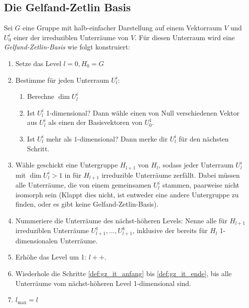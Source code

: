  \subsection{Die Gelfand-Zetlin Basis}
 \begin{definition}
 	\label{def:konstruktion_gz_basis}
	Sei $G$ eine Gruppe mit halb-einfacher Darstellung auf einem Vektorraum $V$ und $U^i_0$ einer der irreduziblen Unterräume von $V$. Für diesen Unterraum wird eine \emph{Gelfand-Zetlin-Basis} wie folgt konstruiert:
	\begin{enumerate}[label={\arabic*.)}]
		\item Setze das Level $l=0, H_0 = G$
		\item Bestimme für jeden Unterraum $U_l^i$: \label{def:gz_it_anfang}
		\begin{enumerate}
			\item Berechne $\dim{U_l^i}$
			\item Ist $U_l^i$ 1-dimensional? Dann wähle einen von Null verschiedenen Vektor aus $U_l^i$ als einen der Basisvektoren von $U^1_0$.
			\item Ist $U_l^i$ mehr als $1$-dimensional? Dann merke dir $U_l^i$ für den nächsten Schritt.
		\end{enumerate}
		\item Wähle geschickt eine Untergruppe $H_{l+1}$ von $H_{l}$, sodass jeder Unterraum $U_l^i$ mit $\dim{U_l^i}>1$ in für $H_{l+1}$ irreduzible Unterräume  zerfällt. Dabei müssen alle Unterräume, die von einem gemeinsamen $U_l^i$ stammen, paarweise nicht isomorph sein (Klappt dies nicht, ist entweder eine andere Untergruppe zu finden, oder es gibt keine Gelfand-Zetlin-Basis). \label{def:gz_it_ugschritt}
		\item Nummeriere die Unterräume des nächst-höheren Levels: Nenne alle für $H_{l+1}$ irreduziblen Unterräume $U_{l+1}^{1}, \ldots, U_{l+1}^{k}$, inklusive der bereits für $H_l$ 1-dimensionalen Unterräume.
		\item Erhöhe das Level um 1: $l++$. \label{def:gz_it_ende}
		\item Wiederhole die Schritte \ref{def:gz_it_anfang} bis \ref{def:gz_it_ende}, bis alle Unterräume vom nächst-höheren Level 1-dimensional sind.
		\item $l_{\text{max}} = l$
		\end{enumerate}
\end{definition}
